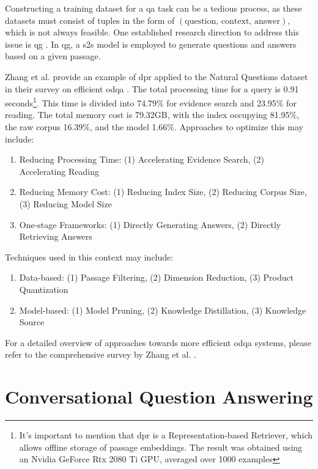 Constructing a training dataset for a \gls{qa} task can be a tedious process, as these datasets must consist of tuples in the form of $(\text{question, context, answer})$, which is not always feasible. One established research direction to address this issue is \gls{qg} \cite{serban_generating_2016}. In \gls{qg}, a \gls{s2s} model is employed to generate questions and answers based on a given passage.

Zhang et al. provide an example of \gls{dpr} applied to the Natural Questions dataset in their survey on efficient \gls{odqa} \cite{zhang_survey_2023}. The total processing time for a query is 0.91 seconds\footnote{It's important to mention that \gls{dpr} is a Representation-based Retriever, which allows offline storage of passage embeddings. The result was obtained using an Nvidia GeForce Rtx 2080 Ti GPU, averaged over 1000 examples}. This time is divided into 74.79\% for evidence search and 23.95\% for reading. The total memory cost is 79.32GB, with the index occupying 81.95\%, the raw corpus 16.39\%, and the model 1.66\%. Approaches to optimize this may include:

\begin{enumerate}
    \item Reducing Processing Time: (1) Accelerating Evidence Search, (2) Accelerating Reading
    \item Reducing Memory Cost: (1) Reducing Index Size, (2) Reducing Corpus Size, (3) Reducing Model Size
    \item One-stage Frameworks: (1) Directly Generating Answers, (2) Directly Retrieving Answers
\end{enumerate}

Techniques used in this context may include:

\begin{enumerate}
    \item Data-based: (1) Passage Filtering, (2) Dimension Reduction, (3) Product Quantization
    \item Model-based: (1) Model Pruning, (2) Knowledge Distillation, (3) Knowledge Source 
\end{enumerate}

For a detailed overview of approaches towards more efficient \gls{odqa} systems, please refer to the comprehensive survey by Zhang et al. \cite{zhang_survey_2023}.


\section{Conversational Question Answering}
\label{sec:cqa}

